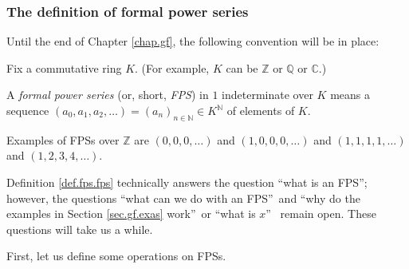\subsubsection{\label{subsec.gf.defs.fps}The definition of formal power
series}

Until the end of Chapter \ref{chap.gf}, the following convention will be in place:

\begin{convention}
Fix a commutative ring $K$. (For example, $K$ can be $\mathbb{Z}$ or
$\mathbb{Q}$ or $\mathbb{C}$.)
\end{convention}

\begin{definition}
\label{def.fps.fps}A \emph{formal power series} (or, short, \emph{FPS}) in $1$
indeterminate over $K$ means a sequence $\left(  a_{0},a_{1},a_{2}%
,\ldots\right)  =\left(  a_{n}\right)  _{n\in\mathbb{N}}\in K^{\mathbb{N}}$ of
elements of $K$.
\end{definition}

Examples of FPSs over $\mathbb{Z}$ are $\left(  0,0,0,\ldots\right)  $ and
$\left(  1,0,0,0,\ldots\right)  $ and $\left(  1,1,1,1,\ldots\right)  $ and
$\left(  1,2,3,4,\ldots\right)  $.

Definition \ref{def.fps.fps} technically answers the question
\textquotedblleft what is an FPS\textquotedblright; however, the questions
\textquotedblleft what can we do with an FPS\textquotedblright\ and
\textquotedblleft why do the examples in Section \ref{sec.gf.exas}
work\textquotedblright\ or \textquotedblleft what is $x$\textquotedblright%
\ remain open. These questions will take us a while.

First, let us define some operations on FPSs.

